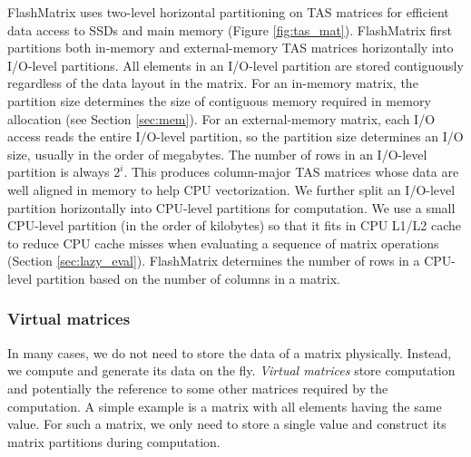 FlashMatrix uses two-level horizontal partitioning on TAS matrices for efficient
data access to SSDs and main memory (Figure \ref{fig:tas_mat}). FlashMatrix
first partitions both in-memory and external-memory TAS matrices horizontally
into I/O-level partitions. All elements in an I/O-level partition are stored
contiguously regardless of the data layout in the matrix. For an in-memory matrix,
the partition size determines the size of contiguous memory required in memory
allocation (see Section \ref{sec:mem}). For an external-memory matrix, each I/O
access reads the entire I/O-level partition, so the partition size determines an I/O
size, usually in the order of megabytes. The number of rows in an I/O-level
partition is always $2^i$. This produces column-major TAS matrices whose data
are well aligned in memory to help CPU vectorization.
We further split an I/O-level partition
horizontally into CPU-level partitions for computation. We use a small
CPU-level partition (in the order of kilobytes) so that it fits in CPU L1/L2
cache to reduce CPU cache misses when evaluating a sequence of matrix
operations (Section \ref{sec:lazy_eval}). FlashMatrix determines the number
of rows in a CPU-level partition based on the number of columns in a matrix.


\subsubsection{Virtual matrices} \label{virt_mat}
In many cases, we do not need to store the data of a matrix physically. Instead,
we compute and generate its data on the fly. \textit{Virtual matrices} store
computation and potentially the reference
to some other matrices required by the computation. A simple example is a matrix
with all elements having the same value. For such a matrix, we only need to store
a single value and construct its matrix partitions during computation.

